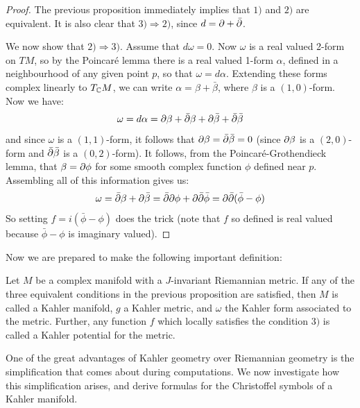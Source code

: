 %
\begin{proof}
The previous proposition immediately implies that $1)$ and $2)$ are equivalent. It is also clear that $3) \Rightarrow 2)$, since $d = \partial + \bar{\partial}$.

We now show that $2) \Rightarrow 3)$.  Assume that $d \omega = 0$.  Now $\omega$ is a real valued 2-form on $TM$, so by the Poincar\'e lemma there is a real valued 1-form $\alpha$, defined in a neighbourhood of any given point $p$, so that $\omega = d \alpha$.  Extending these forms complex linearly to $T_{\mathbb{C}}M$, we can write $\alpha = \beta + \bar{\beta}$, where $\beta$ is a $(1,0)$-form.  Now we have:
%
$$\omega = d \alpha = \partial \beta + \bar{\partial} \beta + \partial \bar{\beta} + \bar{\partial} \bar{\beta}$$
%
and since $\omega$ is a $(1,1)$-form, it follows that $\partial \beta = \bar{\partial} \bar{\beta} = 0$ (since $\partial \beta$ is a $(2,0)$-form and $\bar{\partial} \bar{\beta}$ is a $(0,2)$-form).  It follows, from the Poincar\'e-Grothendieck lemma, that $\beta = \partial \phi$ for some smooth complex function $\phi$ defined near $p$.  Assembling all of this information gives us:
%
$$ \omega = \bar{\partial} \beta + \partial \bar{\beta} = \bar{\partial} \partial \phi + \partial \bar{\partial} \bar{\phi} = \partial \bar{\partial}( \bar{\phi} - \phi ) $$
%
So setting $f = i( \bar{\phi} - \phi )$ does the trick (note that $f$ so defined is real valued because $\bar{\phi} - \phi$ is imaginary valued).
%
\end{proof}
%
Now we are prepared to make the following important definition:
%
\begin{definition} Let $M$ be a complex manifold with a $J$-invariant Riemannian metric.  If any of the three equivalent conditions in the previous proposition are satisfied, then $M$ is called a Kahler manifold, $g$ a Kahler metric, and $\omega$ the Kahler form associated to the metric.  Further, any function $f$ which locally satisfies the condition $3)$ is called a Kahler potential for the metric.
\end{definition}

One of the great advantages of Kahler geometry over Riemannian geometry is the simplification that comes about during computations.  We now investigate how this simplification arises, and derive formulas for the Christoffel symbols of a Kahler manifold.

